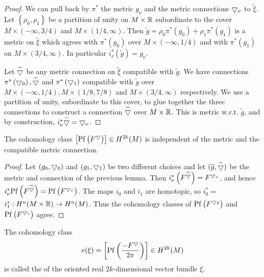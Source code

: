 \begin{proof}
  We can pull back by $\pi^{*}$ the metric $g_{\nu}$ and the metric connections $\bigtriangledown_{\nu}$ to $\widetilde{\xi}$. 
  Let $\left\{\rho_{0}, \rho_{1}\right\}$ be a partition of unity on $M \times {\ensuremath{\mathbb{R}}}$ subordinate to the 
  cover $M \times(-\infty, 3 / 4)$ and $M \times(1 / 4, \infty)$. 
  Then $\widetilde{g}=\rho_{0} \pi^{*}\left(g_{0}\right)+\rho_{1} \pi^{*}\left(g_{1}\right)$ is a metric 
  on $\widetilde{\xi}$ which agrees with $\pi^{*}\left(g_{0}\right)$ over $M \times(-\infty, 1 / 4)$ and 
  with $\pi^{*}\left(g_{1}\right)$ on $M \times(3 / 4, \infty)$. In particular $i_{\nu}^{*}(\widetilde{g})=g_{\nu}$.

  Let $\widetilde{\bigtriangledown}$ be any metric connection on $\tilde{\xi}$ compatible with $\tilde{g}$. We have 
  connections $\pi^{*}\left(\bigtriangledown_{0}\right), \widetilde{\bigtriangledown}$ and $\pi^{*}\left(\bigtriangledown_{1}\right)$ compatible 
  with $\tilde{g}$ over $M \times(-\infty, 1 / 4), M \times(1 / 8,7 / 8)$ and $M \times(3 / 4, \infty)$ respectively. 
  We use a partition of unity, subordinate to this cover, to glue together the three connections to construct a 
  connection $\widetilde{\bigtriangledown}$ over $M \times {\ensuremath{\mathbb{R}}}$. This is metric w.r.t. $\tilde{g}$, and by 
  construction, $i_{\nu}^{*} \widetilde{\bigtriangledown}=\bigtriangledown_\nu$.
\end{proof}

\begin{corollary}\label{corollary:19-3}
  The cohomology class $\left[\mathrm{Pf}\left(F^{\bigtriangledown}\right)\right] \in H^{2 k}(M)$ is independent of the metric
  and the compatible metric connection.
\end{corollary}

\begin{proof}
  Let $\left(g_{0}, \bigtriangledown_{0}\right)$ and $\left(g_{1}, \bigtriangledown_{1}\right)$ be two different choices and 
  let $(\widetilde{g}, \widetilde{\bigtriangledown})$ be the metric and connection of the previous lemma. 
  Then $i_{\nu}^{*}\left(F^{\widetilde{\bigtriangledown}}\right)=F^{\bigtriangledown_{\nu}}$, and 
  hence $i_{\nu}^{*} \mathrm{Pf}\left(F^{\widetilde{\bigtriangledown}}\right)=\mathrm{Pf}\left(F^{\bigtriangledown_{\nu}}\right)$. The 
  maps $i_{0}$ and $i_{1}$ are homotopic, so $i_{0}^{*}=$ $i_{1}^{*}: H^{n}(M \times {\ensuremath{\mathbb{R}}}) \rightarrow H^{n}(M)$. 
  Thus the cohomology classes of $\mathrm{Pf}\left(F^{\bigtriangledown_{0}}\right)$ and $\mathrm{Pf}\left(F^{\bigtriangledown_{1}}\right)$ agree.
\end{proof}


\begin{definition}\label{definition:19-4}
  The cohomology class
  \[
    e(\xi)=\left[\mathrm{Pf}\left(\frac{-F^{\bigtriangledown}}{2 \pi}\right)\right] \in H^{2 k}(M)
  \]
  is called the  of the oriented real $2 k$-dimensional vector bundle $\xi$.
\end{definition}


